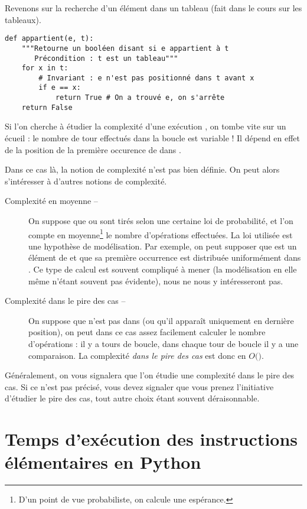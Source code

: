 Revenons sur la recherche d'un élément dans un tableau (fait dans le cours sur les tableaux). 

\begin{lstlisting}
def appartient(e, t):
    """Retourne un booléen disant si e appartient à t
       Précondition : t est un tableau"""
    for x in t:
        # Invariant : e n'est pas positionné dans t avant x
        if e == x:
            return True # On a trouvé e, on s'arrête
    return False
\end{lstlisting}

Si l'on cherche à étudier la complexité d'une exécution , on tombe vite sur un écueil : le nombre de tour effectués dans la boucle  est variable ! 
Il dépend en effet de la position de la première occurence de  dans . 

Dans ce cas là, la notion de complexité n'est pas bien définie. On peut alors s'intéresser à d'autres notions de complexité. 

\begin{description}
  \item[Complexité en moyenne --] On suppose que  ou  sont tirés selon une certaine loi 
de probabilité, et l'on compte \og en moyenne\footnote{D'un point de vue probabiliste, on calcule une 
espérance.} \fg{} le nombre d'opérations effectuées. 
    La loi utilisée est une hypothèse de modélisation. Par exemple, on peut supposer que  est un élément de  et que sa première occurrence est distribuée uniformément dans . 
    Ce type de calcul est souvent compliqué à mener (la modélisation en elle même n'étant souvent pas évidente), nous ne nous y intéresseront pas. 
  \item[Complexité dans le pire des cas --] On suppose que  n'est pas dans  (ou qu'il apparaît uniquement en dernière position), on peut dans ce cas assez facilement calculer le nombre d'opérations : 
    il y a  tours de boucle, dans chaque tour de boucle il y a une comparaison. La complexité \emph{dans le pire des cas} est donc en $O($$)$.
\end{description}

Généralement, on vous signalera que l'on étudie une complexité dans le pire des cas. Si ce n'est pas précisé, vous devez signaler que vous prenez l'initiative d'étudier le pire des cas, tout autre choix étant souvent déraisonnable. 

\section{Temps d'exécution des instructions élémentaires en Python}

